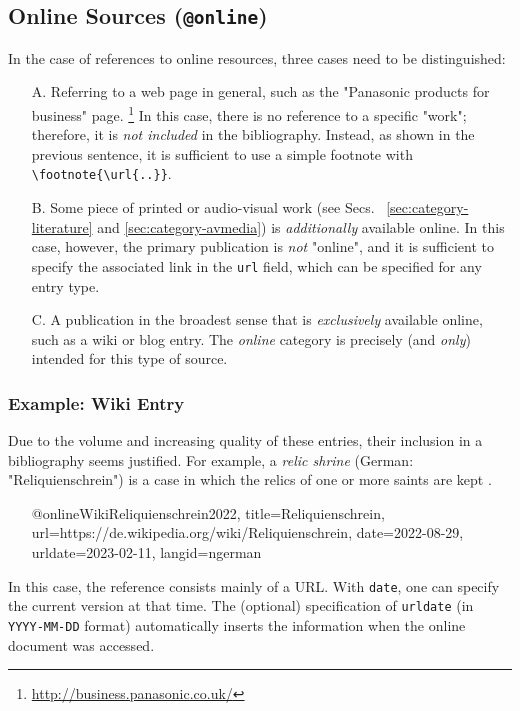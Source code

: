 \subsection{Online Sources (\texttt{\bfseries @online})}
\label{sec:category-online}

In the case of references to online resources, three cases need to be
distinguished:
%
\begin{itemize}
    \item[A.] Referring to a web page in general, such as the "Panasonic
    products for business" page.%
    \footnote{\url{http://business.panasonic.co.uk/}}
    In this case, there is no reference to a specific "work"; therefore, it is
    \emph{not included} in the bibliography. Instead, as shown in the previous
    sentence, it is sufficient to use a simple footnote with
    \verb!\footnote{\url{..}}!.
%
    \item[B.] Some piece of printed or audio-visual work (see Secs.~%
    \ref{sec:category-literature} and \ref{sec:category-avmedia}) is
    \emph{additionally} available online. In this case, however, the primary
    publication is \emph{not} "online", and it is sufficient to specify the
    associated link in the \texttt{url} field, which can be specified for any
    entry type.
%
    \item[C.] A publication in the broadest sense that is
    \emph{exclusively} available online, such as a wiki or blog entry. The \emph{online} category
    is precisely (and \emph{only}) intended for this type of source.
\end{itemize}

\subsubsection{Example: Wiki Entry}
\label{sec:@online-www}

Due to the volume and increasing quality of these entries, their inclusion in
a bibliography seems justified. For example, a \emph{relic shrine} (German:
"Reliquienschrein") is a case in which the relics of one or more saints are
kept \cite{WikiReliquienschrein2022}.
%
\begin{itemize}
\item[]
\begin{GenericCode}[numbers=none]
@online{WikiReliquienschrein2022,
  title={Reliquienschrein},
  url={https://de.wikipedia.org/wiki/Reliquienschrein},
  date={2022-08-29},
  urldate={2023-02-11},
  langid={ngerman}
}
\end{GenericCode}
\item[\cite{WikiReliquienschrein2022}] 
\end{itemize}
%
In this case, the reference consists mainly of a URL. With \texttt{date}, one
can specify the current version at that time. The (optional) specification of
\texttt{urldate} (in \texttt{YYYY-MM-DD} format) automatically inserts the
information when the online document was accessed.

